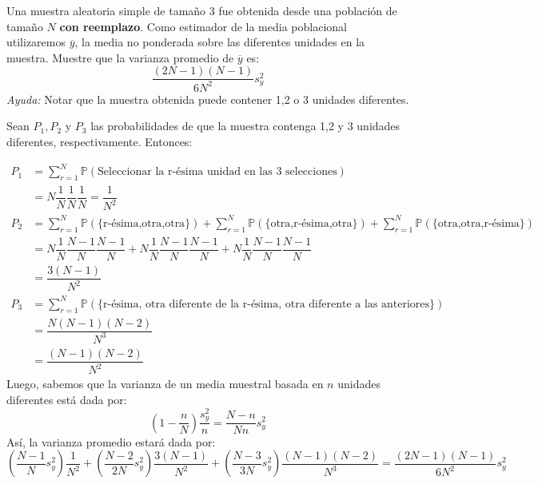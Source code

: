 
\addpoints
\question[15] Una muestra aleatoria simple de tamaño 3 fue obtenida desde una población de tamaño $N$ \textbf{con reemplazo}. Como estimador de la media poblacional utilizaremos $\overline{y}$, la media no ponderada sobre las diferentes unidades en la muestra. Muestre que la varianza promedio de $\overline{y}$ es: 
$$\dfrac{(2N-1)(N-1)}{6N^2}s_{y}^{2}$$
\textit{Ayuda:} Notar que la muestra obtenida puede contener 1,2 o 3 unidades diferentes.
\begin{solution}
Sean $P_1,P_2$ y $P_3$ las probabilidades de que la muestra contenga 1,2 y 3 unidades diferentes, respectivamente. Entonces:

\begin{align*}
P_1 &= \sum_{r=1}^{N} \mathbb{P}( \text{Seleccionar la r-ésima unidad en las 3 selecciones} )\\
 &=N\dfrac{1}{N} \dfrac{1}{N} \dfrac{1}{N}=\dfrac{1}{N^2}\\
P_2 &= \sum_{r=1}^{N} \mathbb{P}( \{\text{r-ésima,otra,otra}\})+\sum_{r=1}^{N} \mathbb{P}( \{\text{otra,r-ésima,otra}\}) +  \sum_{r=1}^{N} \mathbb{P}( \{\text{otra,otra,r-ésima}\})\\
&= N \dfrac{1}{N}\dfrac{N-1}{N}\dfrac{N-1}{N}+ N \dfrac{1}{N}\dfrac{N-1}{N}\dfrac{N-1}{N} + N \dfrac{1}{N}\dfrac{N-1}{N}\dfrac{N-1}{N}\\
&= \dfrac{3(N-1)}{N^2}\\
P_3 &= \sum_{r=1}^{N}\mathbb{P}(\{\text{r-ésima, otra diferente de la r-ésima, otra diferente a las anteriores}\})\\
&= \dfrac{N(N-1)(N-2)}{N^3}\\
&= \dfrac{(N-1)(N-2)}{N^2}
\end{align*}
Luego, sabemos que la varianza de un media muestral basada en $n$ unidades diferentes está dada por:
$$\left(1-\dfrac{n}{N}\right)\dfrac{s_{y}^{2}}{n}=\dfrac{N-n}{Nn}s_{y}^{2}$$
Así, la varianza promedio estará dada por:
$$\left(\dfrac{N-1}{N}s_{y}^{2}\right)\dfrac{1}{N^2}+\left(\dfrac{N-2}{2N}s_{y}^{2}\right)\dfrac{3(N-1)}{N^2}+\left(\dfrac{N-3}{3N}s_{y}^{2}\right)\dfrac{(N-1)(N-2)}{N^3}=\dfrac{(2N-1)(N-1)}{6N^2}s_{y}^{2}$$

\end{solution}